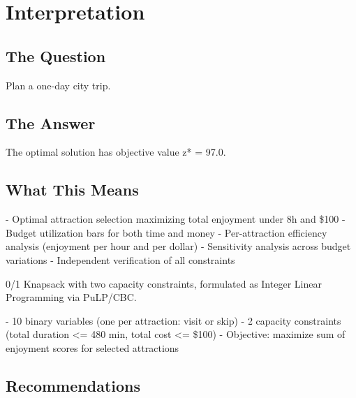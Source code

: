 \documentclass[11pt, a4paper]{article}
\begin{document}
\section{Interpretation}

\subsection{The Question}
Plan a one-day city trip.

\subsection{The Answer}

\begin{polyainsight}[title={Bottom Line}]
The optimal solution has objective value z* = 97.0.
\end{polyainsight}

\subsection{What This Means}

- Optimal attraction selection maximizing total enjoyment under 8h and \$100
- Budget utilization bars for both time and money
- Per-attraction efficiency analysis (enjoyment per hour and per dollar)
- Sensitivity analysis across budget variations
- Independent verification of all constraints

0/1 Knapsack with two capacity constraints, formulated as Integer Linear
Programming via PuLP/CBC.

- 10 binary variables (one per attraction: visit or skip)
- 2 capacity constraints (total duration <= 480 min, total cost <= \$100)
- Objective: maximize sum of enjoyment scores for selected attractions



\subsection{Recommendations}
\end{document}
